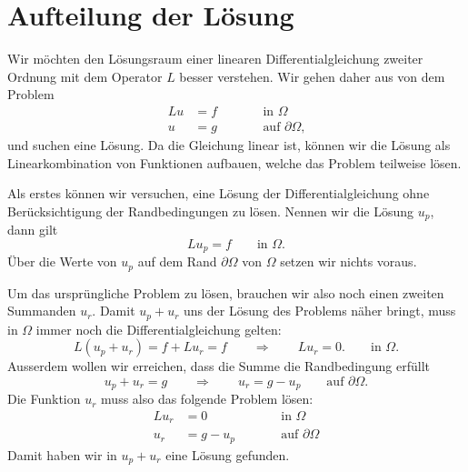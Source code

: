 \section{Aufteilung der Lösung}
Wir möchten den Lösungsraum einer linearen Differentialgleichung
zweiter Ordnung mit dem Operator $L$ besser verstehen.
Wir gehen daher aus von dem Problem
\begin{equation}
\begin{aligned}
Lu&=f&&\qquad\text{in $\Omega$}\\
 u&=g&&\qquad\text{auf $\partial\Omega$,}
\end{aligned}
\label{pdgl2ord:allg}
\end{equation}
und suchen eine Lösung.
Da die Gleichung linear ist, können wir die Lösung als Linearkombination
von Funktionen aufbauen, welche das Problem teilweise lösen.

Als erstes können wir versuchen, eine Lösung der Differentialgleichung
ohne Berücksichtigung der Randbedingungen zu lösen.
Nennen wir die Lösung $u_p$, dann gilt
\begin{equation}
Lu_p=f\qquad\text{in $\Omega$.}
\label{pdgl2ord:up}
\end{equation}
Über die Werte von $u_p$ auf dem Rand $\partial\Omega$ von $\Omega$
setzen wir nichts voraus.

Um das ursprüngliche Problem zu lösen, brauchen wir also noch einen
zweiten Summanden $u_r$. 
Damit $u_p+u_r$ uns der Lösung des Problems näher bringt, muss in
$\Omega$ immer noch die Differentialgleichung gelten:
\[
L(u_p+u_r)=f+Lu_r=f\qquad\Rightarrow\qquad Lu_r=0.
\qquad\text{in $\Omega$.}
\]
Ausserdem wollen wir erreichen, dass die Summe die Randbedingung erfüllt
\[
u_p+u_r=g\qquad\Rightarrow\qquad u_r=g-u_p\qquad\text{auf $\partial\Omega$.}
\]
Die Funktion $u_r$ muss also das folgende Problem lösen:
\begin{equation}
\begin{aligned}
Lu_r&=0&&\qquad\text{in $\Omega$}\\
 u_r&=g-u_p&&\qquad\text{auf $\partial\Omega$}
\end{aligned}
\label{pdgl2ord:ur}
\end{equation}
Damit haben wir in $u_p+u_r$ eine Lösung gefunden.


